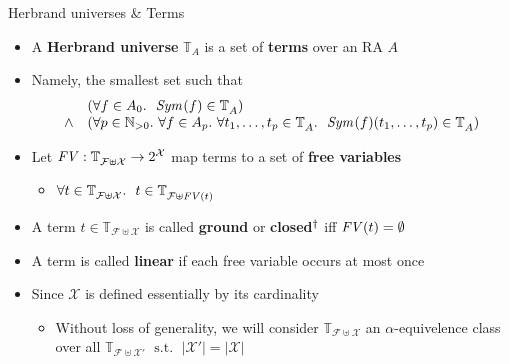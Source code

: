 \documentclass[pdf,fyma2]{prosper} %
\newcommand{\opr}[1]{\ensuremath{\operatorname{#1}}}
\newcommand{\var}[1]{\ensuremath{\text{\textrm{\textit{#1}}}}}
\newcommand{\WHOLE}{\ensuremath{\mathbb{N}_{{>}0}}}
\newcommand{\SYM}[1][]{\ensuremath{\var{Sym}_{#1}}}
\newcommand{\TERMS}[2][]{\ensuremath{\mathbb{T}_{#2}^{#1}}}
\newcommand{\FREEVARS}{\ensuremath{\var{FV}}}
\newcommand{\defn}[1]{\textbf{#1}}
\begin{document}
\begin{slide}{Herbrand universes \& Terms}
	\vspace{1em}
	\begin{itemize}
    \item A \defn{Herbrand universe} $\TERMS{A}$ is a set of \defn{terms} over an RA $A$
    \item Namely, the smallest set such that
\[
\begin{array}{rl}
 & (\forall f\in A_0.~
	~\SYM(f) \in \TERMS{A}) \\
\land & (\forall p \in \WHOLE.~
	\forall f\in A_p.~
		\forall t_1,\ldots,t_p \in \TERMS{A}.~
			~\SYM(f)(t_1,\ldots,t_p) \in \TERMS{A}) \\
\end{array}
\]
    \item Let $\FREEVARS : \TERMS{\mathcal{F}\uplus\mathcal{X}} \to 2^{\mathcal{X}}$ map terms to a set of \defn{free variables}
    	\begin{itemize}
    	\item $\forall t \in \TERMS{\mathcal{F}\uplus\mathcal{X}}.~~ t \in \TERMS{\mathcal{F}\uplus\FREEVARS(t)}$
    	\end{itemize}
    \item A term $t \in \TERMS{\mathcal{F}\uplus\mathcal{X}}$ is called \defn{ground} or \defn{closed}$\null^\dagger$ iff $\FREEVARS(t) = \emptyset$
    \item A term is called \defn{linear} if each free variable occurs at most once
	\vspace{1em}
    \item Since $\mathcal{X}$ is defined essentially by its cardinality
        \begin{itemize}
        \item Without loss of generality, we will consider $\TERMS{\mathcal{F}\uplus\mathcal{X}}$ an $\alpha$-equivelence class over all $\TERMS{\mathcal{F}\uplus\mathcal{X'}} \opr{~s.t.~} \lvert\mathcal{X'}\rvert = \lvert\mathcal{X}\rvert$
        \end{itemize}
	\end{itemize}
\end{slide}
\end{document}
